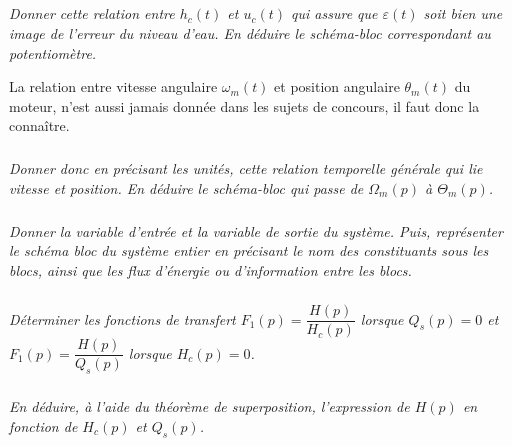 \documentclass[10pt]{article}
\newif\ifprof
\begin{document}
\subparagraph{}
\textit{Donner cette relation entre $h_c (t)$ et $u_c (t)$ qui assure que $\varepsilon (t)$ soit bien une image de l’erreur
du niveau d’eau. En déduire le schéma-bloc correspondant au potentiomètre.}
\ifprof
\begin{corrige}
\end{corrige}
\else
\fi


La relation entre vitesse angulaire $\omega_m(t)$ et position angulaire $\theta_m(t)$ du moteur, n'est aussi jamais donnée
dans les sujets de concours, il faut donc la connaître.

\subparagraph{}
\textit{Donner donc en précisant les unités, cette relation temporelle générale qui lie vitesse et
position. En déduire le schéma-bloc qui passe de $\Omega_m(p)$ à $\Theta_m(p)$.}
\ifprof
\begin{corrige}
\end{corrige}
\else
\fi



\subparagraph{}
\textit{Donner la variable d’entrée et la variable de sortie du système. Puis, représenter le schéma bloc du système entier en précisant le nom des constituants sous les blocs, ainsi que les flux
d’énergie ou d’information entre les blocs.}
\ifprof
\begin{corrige}
\end{corrige}
\else
\fi


\subparagraph{}
\textit{Déterminer les fonctions de transfert $F_1(p)=\dfrac{H(p)}{H_c(p)}$ lorsque $Q_s(p)=0$ et $F_1(p)=\dfrac{H(p)}{Q_s(p)}$ lorsque $H_c(p)=0$.}

\ifprof
\begin{corrige}
\end{corrige}
\else
\fi

\subparagraph{}
\textit{En déduire, à l’aide du théorème de superposition, l’expression de $H(p)$ en fonction de $H_c(p)$ et $Q_s(p)$.}

\ifprof
\begin{corrige}
\end{corrige}
\else
\fi
\end{document}
